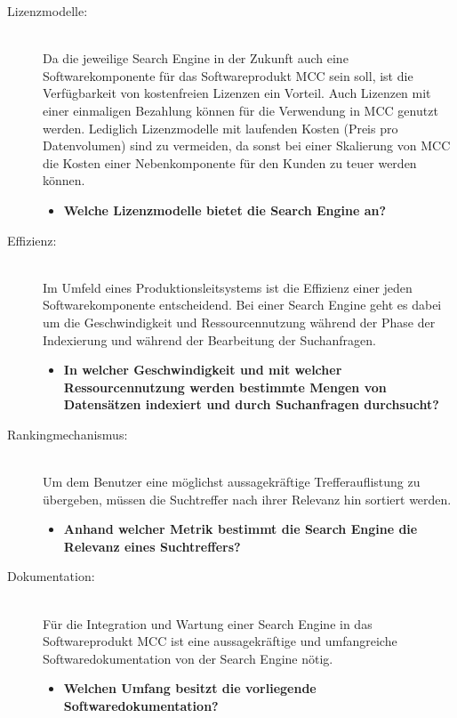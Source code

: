 \begin{description}
    \item[Lizenzmodelle:]\hfill \\
    Da die jeweilige Search Engine in der Zukunft auch eine Softwarekomponente für das Softwareprodukt MCC sein soll, ist die Verfügbarkeit von kostenfreien Lizenzen ein Vorteil. Auch Lizenzen mit einer einmaligen Bezahlung können für die Verwendung in MCC genutzt werden. Lediglich Lizenzmodelle mit laufenden Kosten (Preis pro Datenvolumen) sind zu vermeiden, da sonst bei einer Skalierung von MCC die Kosten einer Nebenkomponente für den Kunden zu teuer werden können.
    
    \begin{itemize}
        \item \textbf{Welche Lizenzmodelle bietet die Search Engine an?}
    \end{itemize}

    \item[Effizienz:]\hfill \\
    Im Umfeld eines Produktionsleitsystems ist die Effizienz einer jeden Softwarekomponente entscheidend. Bei einer Search Engine geht es dabei um die Geschwindigkeit und Ressourcennutzung während der Phase der Indexierung und während der Bearbeitung der Suchanfragen.

    \begin{itemize}
        \item \textbf{In welcher Geschwindigkeit und mit welcher Ressourcennutzung werden bestimmte Mengen von Datensätzen indexiert und durch Suchanfragen durchsucht?}
    \end{itemize}
    
    \item[Rankingmechanismus:]\hfill \\
    Um dem Benutzer eine möglichst aussagekräftige Trefferauflistung zu übergeben, müssen die Suchtreffer nach ihrer Relevanz hin sortiert werden.

    \begin{itemize}
        \item \textbf{Anhand welcher Metrik bestimmt die Search Engine die Relevanz eines Suchtreffers?}
    \end{itemize}

    \item[Dokumentation:]\hfill \\
    Für die Integration und Wartung einer Search Engine in das Softwareprodukt MCC ist eine aussagekräftige und umfangreiche Softwaredokumentation von der Search Engine nötig.

    \begin{itemize}
        \item \textbf{Welchen Umfang besitzt die vorliegende Softwaredokumentation?}
    \end{itemize}

\end{description}

